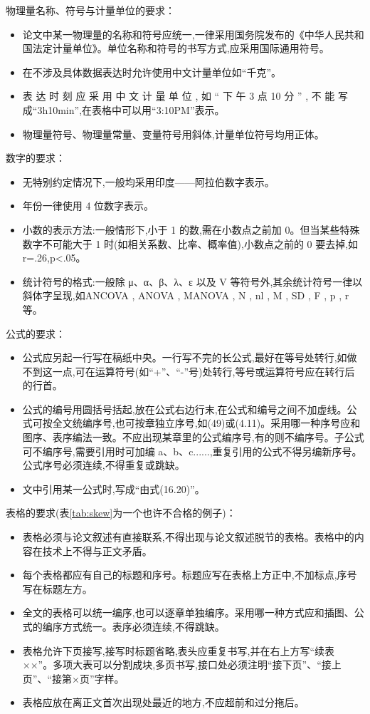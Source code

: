 ﻿\documentclass{sysuthesis}
\begin{document}
物理量名称、符号与计量单位的要求：

\begin{itemize}
\item 论文中某一物理量的名称和符号应统一,一律采用国务院发布的《中华人民共和国法定计量单位》。单位名称和符号的书写方式,应采用国际通用符号。
\item 在不涉及具体数据表达时允许使用中文计量单位如“千克”。
\item 表 达 时 刻 应 采 用 中 文 计 量 单 位 , 如 “ 下 午 3 点 10 分 ” , 不 能 写 成“3h10min”,在表格中可以用“3:10PM”表示。
\item 物理量符号、物理量常量、变量符号用斜体,计量单位符号均用正体。
\end{itemize}

数字的要求：

\begin{itemize}
\item 无特别约定情况下,一般均采用印度——阿拉伯数字表示。
\item 年份一律使用 4 位数字表示。
\item 小数的表示方法:一般情形下,小于 1 的数,需在小数点之前加 0。但当某些特殊数字不可能大于 1 时(如相关系数、比率、概率值),小数点之前的 0 要去掉,如 r=.26,p<.05。
\item 统计符号的格式:一般除 μ、α、β、λ、ε 以及 V 等符号外,其余统计符号一律以斜体字呈现,如ANCOVA , ANOVA , MANOVA , N , nl , M , SD , F , p , r 等。
\end{itemize}

公式的要求：

\begin{itemize}
\item 公式应另起一行写在稿纸中央。一行写不完的长公式,最好在等号处转行,如做不到这一点,可在运算符号(如“+”、“-”号)处转行,等号或运算符号应在转行后的行首。
\item 公式的编号用圆括号括起,放在公式右边行末,在公式和编号之间不加虚线。公式可按全文统编序号,也可按章独立序号,如(49)或(4.11)。采用哪一种序号应和图序、表序编法一致。不应出现某章里的公式编序号,有的则不编序号。子公式可不编序号,需要引用时可加编 a、b、c......,重复引用的公式不得另编新序号。公式序号必须连续,不得重复或跳缺。
\item 文中引用某一公式时,写成“由式(16.20)”。
\end{itemize}

表格的要求(表\ref{tab:skew}为一个也许不合格的例子)：

\begin{itemize}
\item 表格必须与论文叙述有直接联系,不得出现与论文叙述脱节的表格。表格中的内容在技术上不得与正文矛盾。
\item 每个表格都应有自己的标题和序号。标题应写在表格上方正中,不加标点,序号写在标题左方。
\item 全文的表格可以统一编序,也可以逐章单独编序。采用哪一种方式应和插图、公式的编序方式统一。表序必须连续,不得跳缺。
\item 表格允许下页接写,接写时标题省略,表头应重复书写,并在右上方写“续表××”。多项大表可以分割成块,多页书写,接口处必须注明“接下页”、“接上页”、“接第×页”字样。
\item 表格应放在离正文首次出现处最近的地方,不应超前和过分拖后。
\end{itemize}
\end{document}
